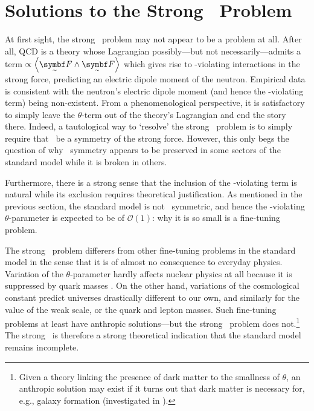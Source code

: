 \chapter{Solutions to the Strong \CP\ Problem}

At first sight, the strong \CP\ problem may not appear to be a problem at all.
After all, QCD is a theory whose Lagrangian possibly---but not necessarily---admits a term $\propto \angbr{\tsbm F \wedge \tsbm F}$ which gives rise to \CP-violating interactions in the strong force, predicting an electric dipole moment of the neutron.
Empirical data is consistent with the neutron's electric dipole moment (and hence the \CP-violating term) being non-existent.
From a phenomenological perspective, it is satisfactory to simply leave the $θ$-term out of the theory's Lagrangian and end the story there.
Indeed, a tautological way to `resolve' the strong \CP\ problem is to simply require that \CP\ be a symmetry of the strong force.
However, this only begs the question of why \CP\ symmetry appears to be preserved in some sectors of the standard model while it is broken in others.

Furthermore, there is a strong sense that the inclusion of the \CP-violating term is natural while its exclusion requires theoretical justification.
As mentioned in the previous section, the standard model is not \CP\ symmetric, and hence the \CP-violating $θ$-parameter is expected to be of $\mathcal{O}(1)$: why it is so small is a fine-tuning problem.

The strong \CP\ problem differers from other fine-tuning problems in the standard model in the sense that it is of almost no consequence to everyday physics.
Variation of the $θ$-parameter hardly affects nuclear physics at all because it is suppressed by quark masses \cite{Dine_2018}.
On the other hand, variations of the cosmological constant predict universes drastically different to our own, and similarly for the value of the weak scale, or the quark and lepton masses.
Such fine-tuning problems at least have anthropic solutions---but the strong \CP\ problem does not.\footnote{
	Given a theory linking the presence of dark matter to the smallness of $θ$, an anthropic solution may exist if it turns out that dark matter is necessary for, e.g., galaxy formation (investigated in \cite{Dine_2018}).
}
The strong \CP\ is therefore a strong theoretical indication that the standard model remains incomplete.

